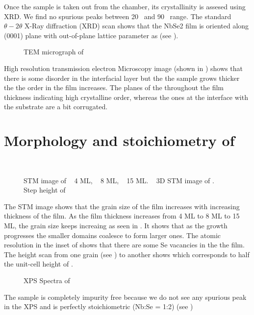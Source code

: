 Once the sample is taken out from the chamber, its crystallinity is assesed using XRD.
We find no spurious peaks between 20 \degree\ and 90 \degree\ range. The standard $\theta-2\theta$ X-Ray 
diffraction (XRD) scan shows that the NbSe2 film is oriented along (0001) plane with out-of-plane 
lattice parameter as  (see ).

\begin{figure}
    \centering
    \caption{
        TEM micrograph of \nbse\
    } 
\end{figure}

High resolution transmission electron Microscopy image (shown in ) shows that 
there is some disorder in the interfacial layer but the the sample grows thicker the 
the order in the film increases. The planes of the \nbse throughout the film thickness indicating 
high crystalline order, whereas the ones at the interface with the substrate are a bit corrugated. 

\section{Morphology and stoichiometry of \nbse}
\begin{figure}
   
    \centering
    \\
    \caption{
        STM image of \nbse
        \sfA~ 4 ML, 
        \sfB~  8 ML,  
        \sfC~  15 ML.
        \sfD~ 3D STM image of \nbse.
        \sfE~ Step height of \nbse
    }
\end{figure}

The STM image shows that the grain size of the film increases with increasing thickness of the film. 
As the film thickness increases from 4 ML to 8 ML to 15 ML, the grain size keeps increaing as seen in 
\tref{stm-NbSe2}. It shows that as the growth progresses the smaller domains coalesce to form larger ones.
The atomic resolution in the inset of \tref{stm-NbSe2-15ML} shows that there are some 
Se vacancies in the the film. The height scan from one grain (see \tref{stm-NbSe2}) 
to another shows \aerr{6.4}{0.1} which corresponds to half the unit-cell height of \nbse.


\begin{figure}
    \centering
    \caption{
        XPS Spectra of \nbse\
    } 
\end{figure}

The sample is completely impurity free because we do not see any spurious peak in the XPS
and is perfectly stoichiometric (Nb:Se = 1:2) (see )